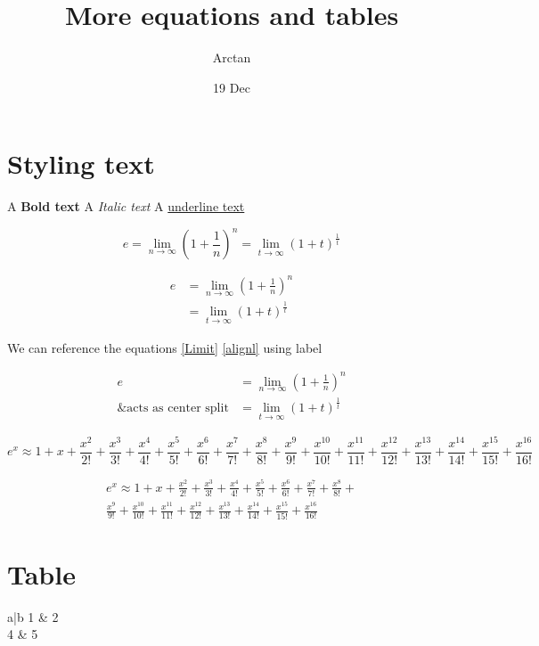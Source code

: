 \documentclass{article}
\title{More equations and tables}
\author{Arctan}
\date{19 Dec}
\begin{document}
\maketitle

\section{Styling text}

A \textbf{Bold text}
A \textit{Italic text}
A \underline{underline text}

    \begin{equation}
    \label{Limit}
        e = \lim_{n\to\infty}\left(1+\frac{1}{n}\right)^n
          = \lim_{t\to\infty}(1+t)^\frac{1}{t}
    \end{equation}

    \begin{align}
    \label{alignl}
        e& = \lim_{n\to\infty}\left(1+\frac{1}{n}\right)^n \\ 
          &= \lim_{t\to\infty}(1+t)^\frac{1}{t}
    \end{align}

    We can reference the equations \ref{Limit} \ref{alignl} using label 

    \begin{equation}
    \begin{split}
        e &= \lim_{n\to\infty}\left(1+\frac{1}{n}\right)^n \\
        \text{\& acts as center split}  &= \lim_{t\to\infty}(1+t)^\frac{1}{t}
    \end{split} 
    \end{equation}

    \begin{equation}
        e^x \approx 1 + x + \frac{x^2}{2!} + \frac{x^3}{3!}+ \frac{x^4}{4!}+ \frac{x^5}{5!}+ \frac{x^6}{6!}+ \frac{x^7}{7!}+ \frac{x^8}{8!}+ \frac{x^9}{9!}+ \frac{x^10}{10!}+ \frac{x^11}{11!}+ \frac{x^12}{12!}+ \frac{x^13}{13!}+ \frac{x^14}{14!}+ \frac{x^15}{15!}+ \frac{x^16}{16!}
    \end{equation}

    \begin{multline}
        e^x \approx 1 + x + \frac{x^2}{2!} + \frac{x^3}{3!}+ \frac{x^4}{4!}+ \frac{x^5}{5!}+ \frac{x^6}{6!}+ \frac{x^7}{7!}+ \frac{x^8}{8!}+ \\ \frac{x^9}{9!}+ \frac{x^10}{10!}+ \frac{x^11}{11!}+ \frac{x^12}{12!}+ \frac{x^13}{13!}+ \frac{x^14}{14!}+ \frac{x^15}{15!}+ \frac{x^16}{16!}
    \end{multline}

    \section{Table}

    \begin{tabular}{a|b}
        1 & 2 \\
        4 & 5
    \end{tabular}
\end{document}
